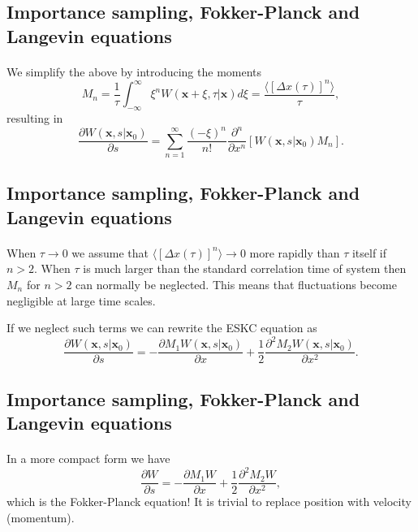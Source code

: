 \documentclass[%
oneside,                 %
final,                   %
10pt]{article}
\begin{document}
\subsection{Importance sampling, Fokker-Planck and Langevin equations}

\paragraph{}
We simplify the above by introducing the moments 
\[
M_n=\frac{1}{\tau}\int_{-\infty}^{\infty} \xi^nW(\mathbf{x}+\xi,\tau|\mathbf{x})d\xi=
\frac{\langle [\Delta x(\tau)]^n\rangle}{\tau},
\]
resulting in
\[
\frac{\partial W(\mathbf{x},s|\mathbf{x}_0)}{\partial s}=
\sum_{n=1}^{\infty}\frac{(-\xi)^n}{n!}\frac{\partial^n}{\partial x^n}
\left[W(\mathbf{x},s|\mathbf{x}_0)M_n\right].
\]



\subsection{Importance sampling, Fokker-Planck and Langevin equations}

\paragraph{}
When $\tau \rightarrow 0$ we assume that $\langle [\Delta x(\tau)]^n\rangle \rightarrow 0$ more rapidly than $\tau$ itself if $n > 2$. 
When $\tau$ is much larger than the standard correlation time of 
system then $M_n$ for $n > 2$ can normally be neglected.
This means that fluctuations become negligible at large time scales.

If we neglect such terms we can rewrite the ESKC equation as 
\[
\frac{\partial W(\mathbf{x},s|\mathbf{x}_0)}{\partial s}=
-\frac{\partial M_1W(\mathbf{x},s|\mathbf{x}_0)}{\partial x}+
\frac{1}{2}\frac{\partial^2 M_2W(\mathbf{x},s|\mathbf{x}_0)}{\partial x^2}.
\]



\subsection{Importance sampling, Fokker-Planck and Langevin equations}

\paragraph{}
In a more compact form we have
\[
\frac{\partial W}{\partial s}=
-\frac{\partial M_1W}{\partial x}+
\frac{1}{2}\frac{\partial^2 M_2W}{\partial x^2},
\]
which is the Fokker-Planck equation!  It is trivial to replace 
position with velocity (momentum).
\end{document}
